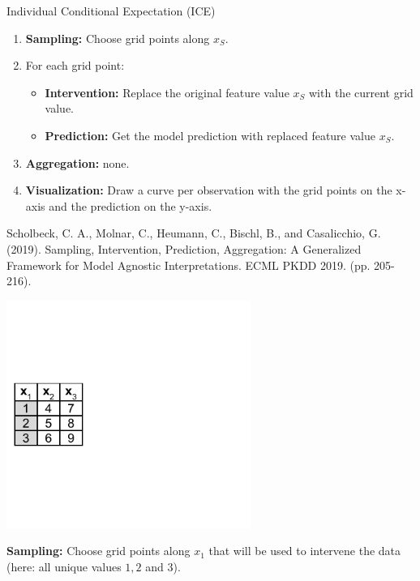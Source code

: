 \documentclass[11pt,compress,t,notes=noshow, xcolor=table]{beamer}
\begin{document}
\begin{vbframe}{Individual Conditional Expectation (ICE)}
\begin{enumerate}
\item \textbf{Sampling:} Choose grid points along $x_S$.
\item For each grid point:
  \begin{itemize}
    \item \textbf{Intervention:} Replace the original feature value $x_S$ with the current grid value.
    \item \textbf{Prediction:} Get the model prediction with replaced feature value $x_S$.
  \end{itemize}
\item \textbf{Aggregation:} none.
\item \textbf{Visualization:} Draw a curve per observation with the grid points on the x-axis and the prediction on the y-axis.
\end{enumerate}

\vspace{0.3cm}
\tiny{Scholbeck, C. A., Molnar, C., Heumann, C., Bischl, B., and Casalicchio, G. (2019). Sampling, Intervention, Prediction, Aggregation: A Generalized Framework for Model Agnostic Interpretations. ECML PKDD 2019. (pp. 205-216). \par}
\normalsize

\framebreak

\begin{center}
\includegraphics[page=1, width=0.6\textwidth]{figure_man/ice_pd_plot_demo}
\end{center}

\textbf{Sampling:} Choose grid points along $x_1  $ that will be used to intervene the data (here: all unique values $1, 2$ and $3$).

\framebreak


\end{vbframe}
\end{document}
